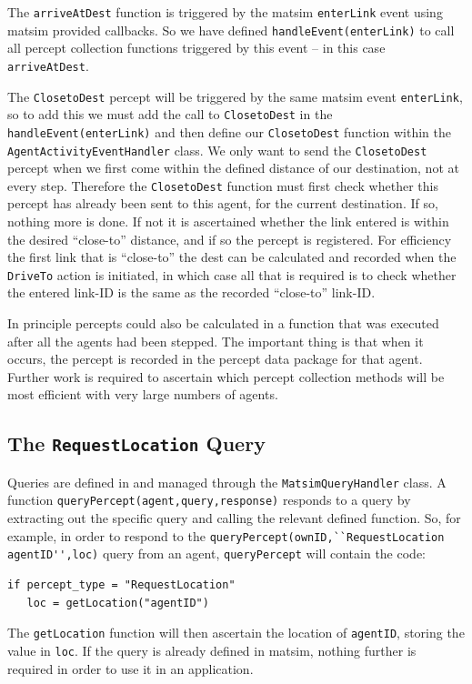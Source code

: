 The \lstinline{arriveAtDest} function is triggered by the \gls{matsim}
\lstinline{enterLink} event using \gls{matsim} provided callbacks. So
we have defined \lstinline{handleEvent(enterLink)} to call all percept
  collection functions triggered by this event -- in this case
  \lstinline{arriveAtDest}. 

The \lstinline{ClosetoDest} percept will be triggered by the same \gls{matsim}
event \lstinline{enterLink}, so to add this we must add the call to
\lstinline{ClosetoDest} in the \lstinline{handleEvent(enterLink)} and then
  define our \lstinline{ClosetoDest} function within the
  \lstinline{AgentActivityEventHandler} class.  We only want to send the
  \lstinline{ClosetoDest} percept when we first come within the defined
  distance of our destination, not at every step. Therefore the
  \lstinline{ClosetoDest} function must first check whether this percept
  has already been sent to this agent, for the current destination. If
  so, nothing more is done. If not it is ascertained whether the link
  entered is within the desired ``close-to'' distance, and if so the
  percept is registered. For efficiency the first link that
    is ``close-to'' the dest can be calculated and recorded when the
    \lstinline{DriveTo} action is initiated, in which case all that is required is
    to check whether the entered link-ID is the same as the recorded
    ``close-to'' link-ID.

In principle percepts could also be calculated in a function that was
executed after all the agents had been stepped. The important thing is
that when it occurs, the percept is recorded in the percept data
package for that agent. Further work is required to ascertain which
percept collection methods will be most efficient with very large
numbers of agents.

\subsection{The \lstinline{RequestLocation} Query}
Queries are defined in and managed through the \lstinline{MatsimQueryHandler}
class.
A function \lstinline{queryPercept(agent,query,response)} responds to a query by
extracting out the specific query and calling the relevant defined
function. So, for example, in order to respond to the
\lstinline{queryPercept(ownID,``RequestLocation agentID'',loc)} query from an
agent, \lstinline{queryPercept} will contain the code:
\begin{lstlisting}
if percept_type = "RequestLocation"
   loc = getLocation("agentID")
\end{lstlisting}
The \lstinline{getLocation} function will then ascertain the location of
\lstinline{agentID}, storing the value in \lstinline{loc}. 
%
If the query is already defined in \gls{matsim}, nothing further is required
in order to use it in an application.

